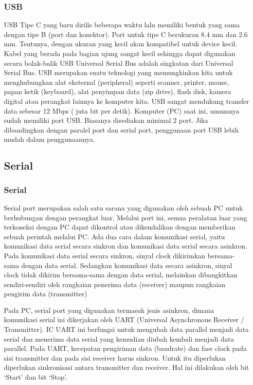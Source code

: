 \subsubsection{USB}
USB Tipe C yang baru dirilis beberapa waktu lalu memiliki bentuk yang sama dengan tipe B (port dan konektor). Port untuk tipe C berukuran 8.4 mm dan 2.6 mm. Tentunya, dengan ukuran yang kecil akan kompatibel untuk device kecil. Kabel yang berada pada bagian ujung sangat kecil sehingga dapat digunakan secara bolak-balik
USB Universal Serial Bus adalah singkatan dari Universal Serial Bus. USB merupakan suatu teknologi yang memungkinkan kita untuk menghubungkan alat eksternal (peripheral) seperti scanner, printer, mouse, papan ketik (keyboard), alat penyimpan data (zip drive), flash disk, kamera digital atau perangkat lainnya ke komputer kita. USB sangat mendukung transfer data sebesar 12 Mbps ( juta bit per detik). Komputer (PC) saat ini, umumnya sudah memiliki port USB. Biasanya disediakan minimal 2 port. Jika dibandingkan dengan paralel port dan serial port, penggunaan port USB lebih mudah dalam penggunaannya.

\subsection{Serial}
\subsubsection{Serial}
Serial port merupakan salah satu sarana yang digunakan oleh sebuah PC untuk berhubungan dengan perangkat luar. Melalui port ini, semua peralatan luar yang terkoneksi dengan PC dapat dikontrol atau dikendalikan dengan memberikan sebuah perintah melalui PC. Ada dua cara dalam komunikasi serial, yaitu komunikasi data serial secara sinkron dan komunikasi data serial secara asinkron. Pada komunikasi data serial secara sinkron, sinyal clock dikirimkan bersama-sama dengan data serial. Sedangkan komunikasi data secara asinkron, sinyal clock tidak dikirim bersama-sama dengan data serial, melainkan
dibangkitkan sendiri-sendiri oleh rangkaian penerima data (receiver) maupun rangkaian pengirim data (transmitter)

Pada PC, serial port yang digunakan termasuk jenis asinkron, dimana komunikasi serial ini dikerjakan oleh UART (Universal Asynchronous Receiver / Transmitter). IC UART ini berfungsi untuk mengubah data parallel menjadi data serial dan menerima data serial yang kemudian diubah kembali menjadi data parallel.
Pada UART, kecepatan pengiriman data (baudrate) dan fase clock pada sisi transmitter dan pada sisi receiver harus sinkron. Untuk itu diperlukan diperlukan sinkronisasi antara transmitter dan receiver. Hal ini dilakukan oleh bit ‘Start’ dan bit ‘Stop’.
